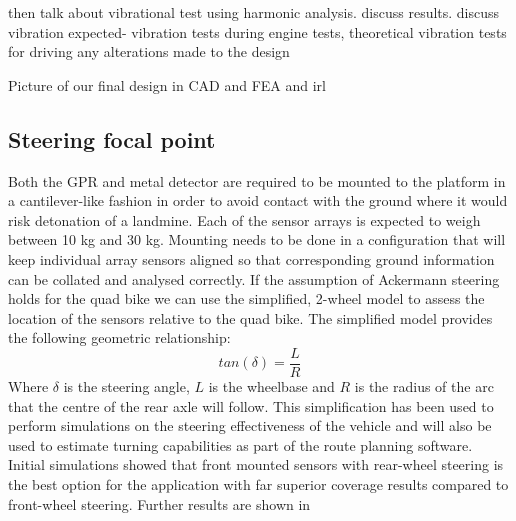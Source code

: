 \documentclass[main.tex]{subfiles}
\begin{document}
then talk about vibrational test using harmonic analysis. discuss results. discuss vibration expected- vibration tests during engine tests, theoretical vibration tests for driving
any alterations made to the design

Picture of our final design in CAD and FEA and irl
\subsection{Steering focal point}
Both the GPR and metal detector are required to be mounted to the platform in a cantilever-like fashion in order to avoid contact with the ground where it would risk detonation of a landmine. Each of the sensor arrays is expected to weigh between 10 kg and 30 kg.
Mounting needs to be done in a configuration that will keep individual array sensors aligned so that corresponding ground information can be collated and analysed correctly. If the assumption of Ackermann steering holds for the quad bike we can use the simplified, 2-wheel model to assess the location of the sensors relative to the quad bike. The simplified model provides the following geometric relationship:
$$
tan(\delta) = \frac{L}{R}
$$
Where $\delta$ is the steering angle, $L$ is the wheelbase and $R$ is the radius of the arc that the centre of the rear axle will follow. This simplification has been used to perform simulations on the steering effectiveness of the vehicle and will also be used to estimate turning capabilities as part of the route planning software.
Initial simulations showed that front mounted sensors with rear-wheel steering is the best option for the application with far superior coverage results compared to front-wheel steering. Further results are shown in 
\end{document}
